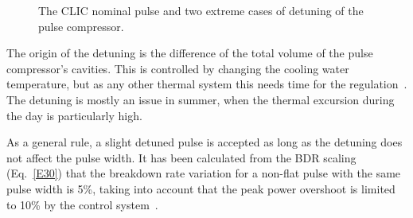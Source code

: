  
\begin{figure}[h]
\centering
{}
\hspace{2mm}
\caption{The CLIC nominal pulse and two extreme cases of detuning of the pulse compressor.}
\label{detuning_fig}
\end{figure}
 



The origin of the detuning is the difference of the total volume of the pulse compressor's cavities. This is controlled by changing the cooling water temperature, but as any other thermal system this needs time for the regulation~\cite{Woolley:CWS2016}. The detuning is mostly an issue in summer, when the thermal excursion during the day is particularly high.

As a general rule, a slight detuned pulse is accepted as long as the detuning does not affect the pulse width. It has been calculated from the BDR scaling (Eq.~\ref{E30}) that the breakdown rate variation for a non-flat pulse with the same pulse width is 5\%, taking into account that the peak power overshoot is limited to 10\% by the control system~\cite{Frank:PC}.  


